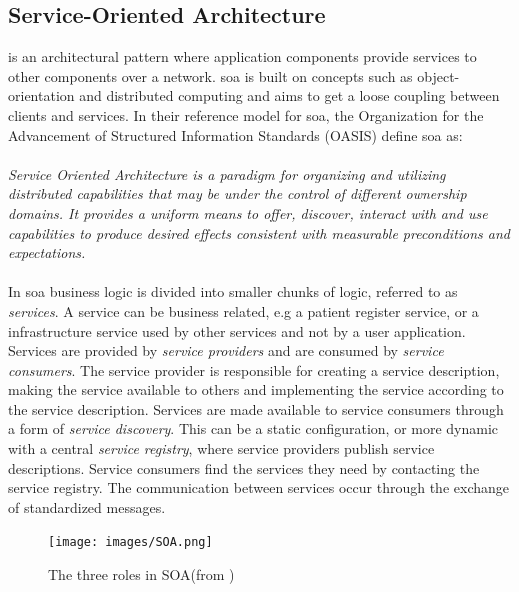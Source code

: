 \documentclass[USenglish]{ifimaster}
\begin{document}
\subsection{Service-Oriented Architecture}
 is an architectural pattern where application components
provide services to other components over a network. \gls{soa} is built on
concepts such as object-orientation and distributed computing and aims to get
a loose coupling between clients and services. In their reference model for
\gls{soa}\cite{oasis-soa-reference-model}, the Organization for the Advancement
of Structured Information Standards (OASIS) define \gls{soa} as: \paragraph{}
\textit{Service Oriented Architecture is a paradigm for organizing and utilizing
distributed capabilities that may be under the control of different ownership
domains. It provides a uniform means to offer, discover, interact with and use
capabilities to produce desired effects consistent with measurable preconditions
and expectations.} %

\paragraph{}
 In \gls{soa} business logic is divided into smaller chunks of logic, referred
 to as \textit{services}. A service can be business related, e.g a patient
 register service, or a infrastructure service used by other services and not by
 a user application.  Services are provided by \textit{service providers} and
 are consumed by \textit{service consumers}. The service provider is responsible
 for creating a service description, making the service available to others and
 implementing the service according to the service description. Services are
 made available to service consumers through a form of \textit{service
 discovery}. This can be a static configuration, or more dynamic with a central
 \textit{service registry}, where service providers publish service
 descriptions. Service consumers find the services they need by contacting the
 service registry. The communication between services occur through the exchange
 of standardized messages.

\begin{figure}[h]
\texttt{[image: images/SOA.png]}
\caption{The three roles in SOA(from \cite{IST-090})}
\end{figure}
\end{document}
